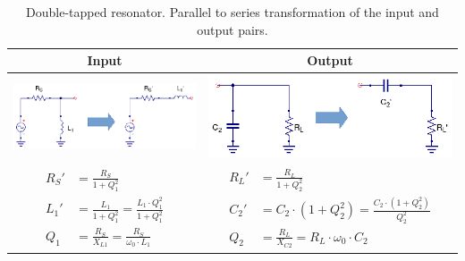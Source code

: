 \begin{table}[H]
  \centering
  \begin{tabular}{ | c | c | }
    \hline
    Input & Output\\ \hline
    \begin{minipage}{.4\textwidth}
      \includegraphics[width=\linewidth]{./images/Synthesis/Impedance_Matching/Double-Tapped-Resonator-p2s-input}
    \end{minipage}
    &
    \begin{minipage}{.4\textwidth}
      \includegraphics[width=\linewidth]{./images/Synthesis/Impedance_Matching/Double-Tapped-Resonator-p2s-output}
    \end{minipage}
\\ \hline
    \begin{minipage}{.4\textwidth}
         {\begin{align}
           R_S' &= \frac{R_S}{1 + Q_1^2}\\
           L_1' &= \frac{L_1}{1 + Q_1^2} = \frac{L_1 \cdot Q_1^2}{1 + Q_1^2}\\
           Q_1 &= \frac{R_S}{X_{L1}} = \frac{R_S}{\omega_0 \cdot L_1}
         \end{align}}
    \end{minipage}
    &
        \begin{minipage}{.4\textwidth}
         {\begin{align}
           R_L' &= \frac{R_L}{1 + Q_2^2}\\
           C_2' &= C_2 \cdot (1 + Q_2^2) = \frac{C_2 \cdot (1 + Q_2^2)}{Q_2^2}\\
           Q_2 &= \frac{R_L}{X_{C2}} = R_L \cdot \omega_0 \cdot C_2
         \end{align}}
    \end{minipage}
    \\ \hline
  \end{tabular}
  \caption{Double-tapped resonator. Parallel to series transformation of the input and output pairs.}
  \label{tbl:tee-matching}
\end{table}
 

